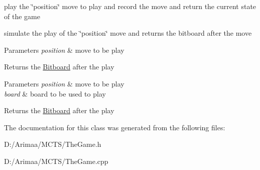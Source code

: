 play the \char`\"{}position\char`\"{} move to play and record the move and return the current state of the game 

simulate the play of the \char`\"{}position\char`\"{} move and returns the bitboard after the move


\begin{DoxyParams}{Parameters}
{\em position} & move to be play \\
\hline
\end{DoxyParams}
\begin{DoxyReturn}{Returns}
the \hyperlink{class_bitboard}{Bitboard} after the play
\end{DoxyReturn}

\begin{DoxyParams}{Parameters}
{\em position} & move to be play \\
\hline
{\em board} & board to be used to play \\
\hline
\end{DoxyParams}
\begin{DoxyReturn}{Returns}
the \hyperlink{class_bitboard}{Bitboard} after the play 
\end{DoxyReturn}


The documentation for this class was generated from the following files\+:\begin{DoxyCompactItemize}
\item 
D\+:/\+Arimaa/\+M\+C\+T\+S/The\+Game.\+h\item 
D\+:/\+Arimaa/\+M\+C\+T\+S/The\+Game.\+cpp\end{DoxyCompactItemize}
